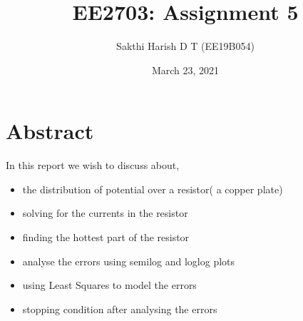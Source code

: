 \documentclass{article}
\title{EE2703: Assignment 5}
\author{Sakthi Harish D T (EE19B054)}
\date{March 23, 2021}
\begin{document}
	
	

  \section{Abstract}
  In this report we wish to discuss about,\newline
  \begin{itemize}
      \item the distribution of potential over a resistor( a copper plate) \newline
      \item solving for the currents in the resistor\newline
      \item finding the hottest part of the resistor\newline
      \item analyse the errors using semilog and loglog plots \newline
      \item using Least Squares to model the errors \newline
      \item stopping condition after analysing the errors \newline
  \end{itemize}
\end{document}

